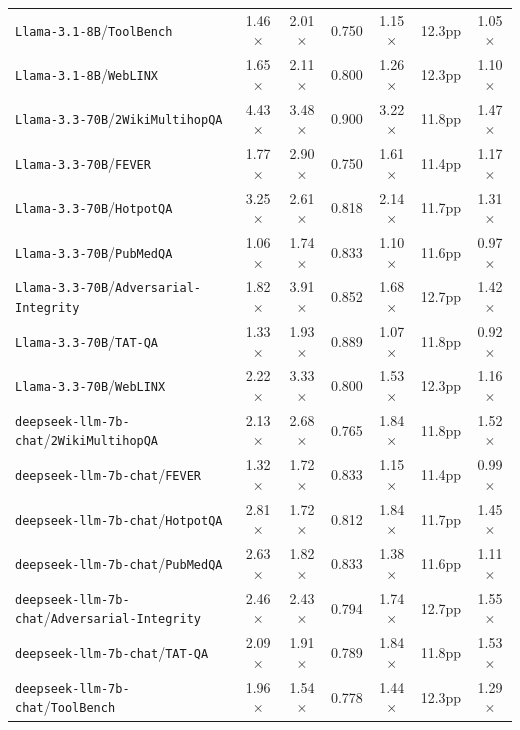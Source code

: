 \begin{longtable}{lcccccc}
\texttt{Llama-3.1-8B}/\texttt{ToolBench} & 1.46$\times$ & 2.01$\times$ & 0.750 & 1.15$\times$ & 12.3pp & 1.05$\times$ \\
\texttt{Llama-3.1-8B}/\texttt{WebLINX} & 1.65$\times$ & 2.11$\times$ & 0.800 & 1.26$\times$ & 12.3pp & 1.10$\times$ \\
\texttt{Llama-3.3-70B}/\texttt{2WikiMultihopQA} & 4.43$\times$ & 3.48$\times$ & 0.900 & 3.22$\times$ & 11.8pp & 1.47$\times$ \\
\texttt{Llama-3.3-70B}/\texttt{FEVER} & 1.77$\times$ & 2.90$\times$ & 0.750 & 1.61$\times$ & 11.4pp & 1.17$\times$ \\
\texttt{Llama-3.3-70B}/\texttt{HotpotQA} & 3.25$\times$ & 2.61$\times$ & 0.818 & 2.14$\times$ & 11.7pp & 1.31$\times$ \\
\texttt{Llama-3.3-70B}/\texttt{PubMedQA} & 1.06$\times$ & 1.74$\times$ & 0.833 & 1.10$\times$ & 11.6pp & 0.97$\times$ \\
\texttt{Llama-3.3-70B}/\texttt{Adversarial-Integrity} & 1.82$\times$ & 3.91$\times$ & 0.852 & 1.68$\times$ & 12.7pp & 1.42$\times$ \\
\texttt{Llama-3.3-70B}/\texttt{TAT-QA} & 1.33$\times$ & 1.93$\times$ & 0.889 & 1.07$\times$ & 11.8pp & 0.92$\times$ \\
\texttt{Llama-3.3-70B}/\texttt{WebLINX} & 2.22$\times$ & 3.33$\times$ & 0.800 & 1.53$\times$ & 12.3pp & 1.16$\times$ \\
\texttt{deepseek-llm-7b-chat}/\texttt{2WikiMultihopQA} & 2.13$\times$ & 2.68$\times$ & 0.765 & 1.84$\times$ & 11.8pp & 1.52$\times$ \\
\texttt{deepseek-llm-7b-chat}/\texttt{FEVER} & 1.32$\times$ & 1.72$\times$ & 0.833 & 1.15$\times$ & 11.4pp & 0.99$\times$ \\
\texttt{deepseek-llm-7b-chat}/\texttt{HotpotQA} & 2.81$\times$ & 1.72$\times$ & 0.812 & 1.84$\times$ & 11.7pp & 1.45$\times$ \\
\texttt{deepseek-llm-7b-chat}/\texttt{PubMedQA} & 2.63$\times$ & 1.82$\times$ & 0.833 & 1.38$\times$ & 11.6pp & 1.11$\times$ \\
\texttt{deepseek-llm-7b-chat}/\texttt{Adversarial-Integrity} & 2.46$\times$ & 2.43$\times$ & 0.794 & 1.74$\times$ & 12.7pp & 1.55$\times$ \\
\texttt{deepseek-llm-7b-chat}/\texttt{TAT-QA} & 2.09$\times$ & 1.91$\times$ & 0.789 & 1.84$\times$ & 11.8pp & 1.53$\times$ \\
\texttt{deepseek-llm-7b-chat}/\texttt{ToolBench} & 1.96$\times$ & 1.54$\times$ & 0.778 & 1.44$\times$ & 12.3pp & 1.29$\times$ \\

\end{longtable}
